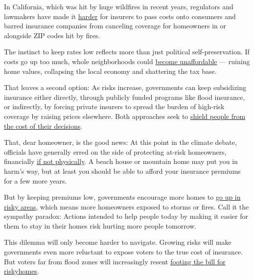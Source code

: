 In California, which was hit by huge wildfires in recent years,
regulators and lawmakers have made it
\href{https://www.bloomberg.com/news/articles/2018-08-15/why-two-years-of-historic-wildfires-haven-t-made-southern-california-safer}{harder}
for insurers to pass costs onto consumers and barred insurance companies
from canceling coverage for homeowners in or alongside ZIP codes hit by
fires.

The instinct to keep rates low reflects more than just political
self-preservation. If costs go up too much, whole neighborhoods could
\href{https://www.bloomberg.com/news/articles/2018-01-04/california-says-wildfires-are-making-home-insurance-unaffordable}{become
unaffordable} --- ruining home values, collapsing the local economy and
shattering the tax base.

That leaves a second option: As risks increase, governments can keep
subsidizing insurance either directly, through publicly funded programs
like flood insurance, or indirectly, by forcing private insurers to
spread the burden of high-risk coverage by raising prices elsewhere.
Both approaches seek to
\href{https://www.bloomberg.com/news/features/2018-03-01/why-is-california-rebuilding-in-fire-country-because-you-re-paying-for-it}{shield
people from the cost of their decisions}.

That, dear homeowner, is the good news: At this point in the climate
debate, officials have generally erred on the side of protecting at-risk
homeowners, financially
\href{https://www.nytimes3xbfgragh.onion/2019/10/26/climate/building-codes-secret-deal.html}{if
not physically}. A beach house or mountain home may put you in harm's
way, but at least you should be able to afford your insurance premiums
for a few more years.

But by keeping premiums low, governments encourage more homes to
\href{https://www.nytimes3xbfgragh.onion/2019/07/31/climate/climate-change-new-homes-flooding.html}{go
up in risky areas}, which means more homeowners exposed to storms or
fires. Call it the sympathy paradox: Actions intended to help people
today by making it easier for them to stay in their homes risk hurting
more people tomorrow.

This dilemma will only become harder to navigate. Growing risks will
make governments even more reluctant to expose voters to the true cost
of insurance. But voters far from flood zones will increasingly resent
\href{https://www.nytimes3xbfgragh.onion/2019/09/27/climate/mortgage-climate-risk.html}{footing
the bill for
risky}\href{https://www.nytimes3xbfgragh.onion/2019/09/27/climate/mortgage-climate-risk.html}{homes}.

